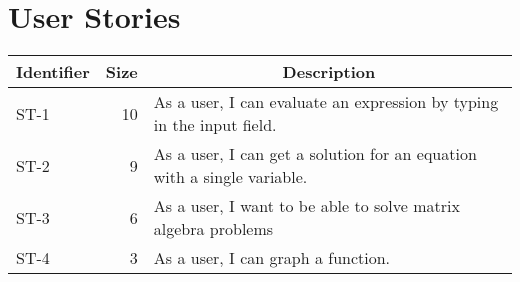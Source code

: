 \documentclass[letterpaper]{article}
\begin{document}
\newpage

\section{User Stories}

\begin{tabular}{|l|r|l|}
\hline
\multicolumn{1}{|c|}{\textbf{Identifier}} & \multicolumn{1}{c|}{\textbf{Size}} & \multicolumn{1}{c|}{\textbf{Description}} \\ \hline
ST-1 & 10 & As a user, I can evaluate an expression by typing in the input field. \\ \hline
ST-2 & 9  & As a user, I can get a solution for an equation with a single variable. \\ \hline
ST-3 & 6  & As a user, I want to be able to solve matrix algebra problems \\ \hline
ST-4 & 3  & As a user, I can graph a function. \\ \hline
\end{tabular}
\end{document}
